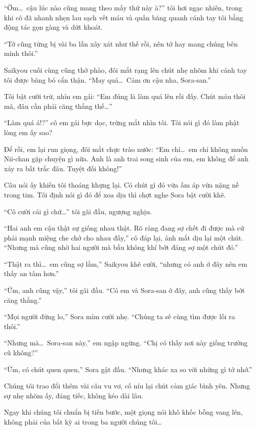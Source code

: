 \documentclass[../main.tex]{subfiles}
\begin{document}
``Ờm\dots\ cậu lúc nào cũng mang theo mấy thứ này à?'' tôi hơi ngạc nhiên, trong khi cô đã nhanh nhẹn lau sạch vết máu và quấn băng quanh cánh tay tôi bằng động tác gọn gàng và dứt khoát.

``Tớ cũng từng bị vài ba lần xây xát như thế rồi, nên tớ hay mang chúng bên mình thôi.''

Saikyou cuối cùng cũng thở phào, đôi mắt rạng lên chút nhẹ nhõm khi cánh tay tôi được băng bó cẩn thận. ``May quá\dots\ Cảm ơn cậu nha, Sora-san.''

Tôi bật cười trừ, nhìn em gái: ``Em đúng là làm quá lên rồi đấy. Chút máu thôi mà, đâu cần phải căng thẳng thế\dots''

``Làm quá á!?'' cô em gái bực dọc, trừng mắt nhìn tôi. Tôi nói gì đó làm phật lòng em ấy sao?

Để rồi, em lại run giọng, đôi mắt chực trào nước: ``Em chỉ\dots\ em chỉ không muốn Nii-chan gặp chuyện gì nữa. Anh là anh trai song sinh của em, em không để anh xảy ra bất trắc đâu. Tuyệt đối không!''

Câu nói ấy khiến tôi thoáng khựng lại. Có chút gì đó vừa ấm áp vừa nặng nề trong tim. Tôi định nói gì đó để xoa dịu thì chợt nghe Sora bật cười khẽ.

``Cô cười cái gì chứ\dots'' tôi gãi đầu, ngượng nghịu.

``Hai anh em cậu thật sự giống nhau thật. Rõ ràng đang sợ chết đi được mà cứ phải mạnh miệng che chở cho nhau đấy,'' cô đáp lại, ánh mắt dịu lại một chút. ``Nhưng mà cũng nhờ hai người mà bầu không khí bớt đáng sợ một chút đó.''

``Thật ra thì\dots\ em cũng sợ lắm,'' Saikyou khẽ cười, ``nhưng có anh ở đây nên em thấy an tâm hơn.''

``Ừm, anh cũng vậy,'' tôi gãi đầu. ``Có em và Sora-san ở đây, anh cũng thấy bớt căng thẳng.''

``Mọi người đừng lo,'' Sora mỉm cười nhẹ. ``Chúng ta sẽ cùng tìm được lối ra thôi.''

``Nhưng mà\dots\ Sora-san này,'' em ngập ngừng. ``Chị có thấy nơi này giống trường cũ không?''

``Ừm, có chút quen quen,'' Sora gật đầu. ``Nhưng khác xa so với những gì tớ nhớ.''

Chúng tôi trao đổi thêm vài câu vu vơ, cố níu lại chút cảm giác bình yên. Nhưng sự nhẹ nhõm ấy, đáng tiếc, không kéo dài lâu.

Ngay khi chúng tôi chuẩn bị tiến bước, một giọng nói khô khốc bỗng vang lên, không phải của bất kỳ ai trong ba người chúng tôi\dots
\end{document}
